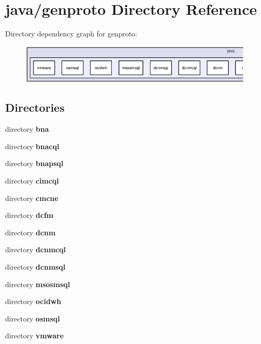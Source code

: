 \section{java/genproto Directory Reference}
\label{dir_0e43b3eaa74cb4b3a4cbe492a3c2d8cb}
Directory dependency graph for genproto\+:\nopagebreak
\begin{figure}[H]
\begin{center}
\leavevmode
\includegraphics[width=350pt]{dir_0e43b3eaa74cb4b3a4cbe492a3c2d8cb_dep}
\end{center}
\end{figure}
\subsection*{Directories}
\begin{DoxyCompactItemize}
\item 
directory {\bf bna}
\item 
directory {\bf bnacql}
\item 
directory {\bf bnapsql}
\item 
directory {\bf cimcql}
\item 
directory {\bf cmcne}
\item 
directory {\bf dcfm}
\item 
directory {\bf dcnm}
\item 
directory {\bf dcnmcql}
\item 
directory {\bf dcnmsql}
\item 
directory {\bf msosmsql}
\item 
directory {\bf ocidwh}
\item 
directory {\bf osmsql}
\item 
directory {\bf vmware}
\end{DoxyCompactItemize}
